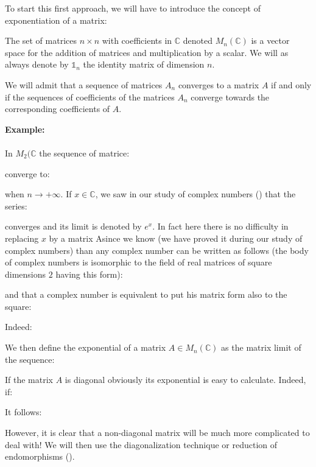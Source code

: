 	To start this first approach, we will have to introduce the concept of exponentiation of a matrix:

	The set of matrices $n \times n$ with coefficients in $\mathbb{C}$ denoted $M_n(\mathbb{C})$ is a vector space for the addition of matrices and multiplication by a scalar. We will as always denote by $\mathds{1}_n$ the identity matrix of dimension $n$.
	
	We will admit that a sequence of matrices $A_n$ converges to a matrix $A$ if and only if the sequences of coefficients of the matrices $A_n$ converge towards the corresponding coefficients of $A$.
	
	\begin{tcolorbox}[colframe=black,colback=white,sharp corners]
	\textbf{{\Large {}}Example:}\\\\
	In $M_2(\mathbb{C}$ the sequence of matrice:
	
	converge to:
	
	when $n\rightarrow +\infty$.
	If $x\in \mathbb{C}$, we saw in our study of complex numbers () that the series:	
	
	converges and its limit is denoted by $e^x$. In fact here there is no difficulty in replacing $x$ by a matrix A$ $since we know (we have proved it during our study of complex numbers) than any complex number can be written as follows (the body of complex numbers is isomorphic to the field of real matrices of square dimensions $2$ having this form):
	
	\end{tcolorbox}
	\pagebreak
	\begin{tcolorbox}[colframe=black,colback=white,sharp corners]
	and that a complex number is equivalent to put his matrix form also to the square:
	
	Indeed:
	
	\end{tcolorbox}
	We then define the exponential of a matrix $A\in M_n(\mathbb{C})$ as the matrix limit of the sequence:
	
	If the matrix $A$ is diagonal obviously its exponential is easy to calculate. Indeed, if:
	
	It follows:
	
	However, it is clear that a non-diagonal matrix will be much more complicated to deal with! We will then use the diagonalization technique or reduction of endomorphisms ().
	
